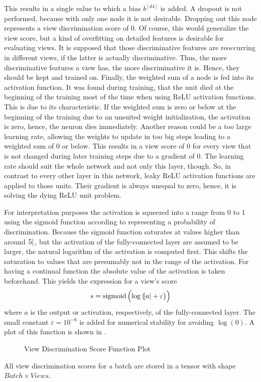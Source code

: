 This results in a single value to which a bias $b^{[d4]}$ is added.
A dropout is not performed, because with only one node it is not desirable.
Dropping out this node represents a view discrimination score of 0.
Of course, this would generalize the view score, but a kind of overfitting on detailed features is desirable for evaluating views.
It is supposed that those discriminative features are reoccurring in different views, if the latter is actually discriminative.
Thus, the more discriminative features a view has, the more discriminative it is.
Hence, they should be kept and trained on.
Finally, the weighted sum of a node is fed into its activation function.
It was found during training, that the unit died at the beginning of the training most of the time when using ReLU activation functions.
This is due to its characteristic.
If the weighted sum is zero or below at the beginning of the training due to an unsuited weight initialization, the activation is zero, hence, the neuron dies immediately.
Another reason could be a too large learning rate, allowing the weights to update in too big steps leading to a weighted sum of 0 or below.
This results in a view score of $0$ for every view that is not changed during later training steps due to a gradient of 0.
The learning rate should suit the whole network and not only this layer, though.
So, in contrast to every other layer in this network, leaky ReLU activation functions are applied to those units.
Their gradient is always unequal to zero, hence, it is solving the dying ReLU unit problem.

For interpretation purposes the activation is squeezed into a range from 0 to 1 using the sigmoid function according to \cite{Feng2018} representing a probability of discrimination.
Because the sigmoid function saturates at values higher than around $\abs{5}$, but the activation of the fully-connected layer are assumed to be larger, the natural logarithm of the activation is computed first.
This shifts the saturation to values that are presumably not in the range of the activation.
For having a continual function the absolute value of the activation is taken beforehand.
This yields the expression for a view's score
\begin{equation}
	\label{eq:view-discrimination-score}
	s = \operatorname{sigmoid}\left( \log \left( \abs{a} + \varepsilon \right) \right)
\end{equation}
where $a$ is the output or activation, respectively, of the fully-connected layer.
The small constant $\varepsilon=10^{-6}$ is added for numerical stability for avoiding $\log(0)$.
A plot of this function is shown in .
\begin{figure}
	\setlength{}
	\setlength{}
	\centering
	
	\caption{View Discrimination Score Function Plot}
	\label{fig:view-discrimination-score}
\end{figure}
All view discrimination scores for a batch are stored in a tensor with shape $Batch \times Views$.

